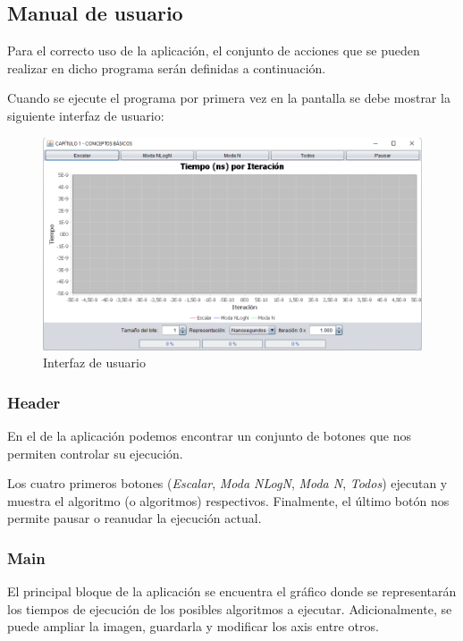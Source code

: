 \subsection{Manual de usuario}

Para el correcto uso de la aplicación, el conjunto de acciones que se pueden realizar en dicho programa serán definidas a continuación.\bigskip

Cuando se ejecute el programa por primera vez en la pantalla se debe mostrar la siguiente interfaz de usuario:

\begin{figure}[!h]
    \centering
    \includegraphics[width=\linewidth]{Usage/img/GUI.png}
    \caption{Interfaz de usuario}
    \label{fig:User_interface}
\end{figure}

\subsubsection{Header}
En el  de la aplicación podemos encontrar un conjunto de botones que nos permiten controlar su ejecución.\bigskip

Los cuatro primeros botones (\textit{Escalar}, \textit{Moda NLogN}, \textit{Moda N}, \textit{Todos}) ejecutan y muestra el algoritmo (o algoritmos) respectivos. Finalmente, el último botón  nos permite pausar o reanudar la ejecución actual.

\subsubsection{Main}
El principal bloque de la aplicación se encuentra el gráfico donde se representarán los tiempos de ejecución de los posibles algoritmos a ejecutar. Adicionalmente, se puede ampliar la imagen, guardarla y modificar los axis entre otros.\bigskip

